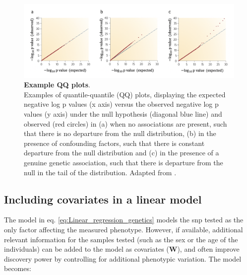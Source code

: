 
\begin{figure}[h]
\centering
\includegraphics[width=15cm]{Chapter2/Fig/qqplots.png}
\caption[QQ plots]{\textbf{Example QQ plots}.\\
Examples of quantile-quantile (QQ) plots, displaying the expected negative log p values (x axis) versus the observed negative log p values (y axis) under the null hypothesis (diagonal blue line) and observed (red circles) in (a) when no associations are present, such that there is no departure from the null distribution,  (b) in the presence of confounding factors, such that there is constant departure from the null distribution and (c) in the presence of a genuine genetic association, such that there is departure from the null in the tail of the distribution.
Adapted from 
\cite{mccarthy2008genome}.
}
\label{fig:qqplots}
\end{figure}



\subsection{Including covariates in a linear model}
\label{sec:confounders}

The model in eq. \eqref{eq:Linear_regression_genetics} models the \gls{snp} tested as the only factor affecting the measured phenotype.
However, if available, additional relevant information for the samples tested (such as the sex or the age of the individuals) can be added to the model as covariates ($\mathbf{W}$), and often improve discovery power by controlling for additional phenotypic variation. 
The model becomes:

